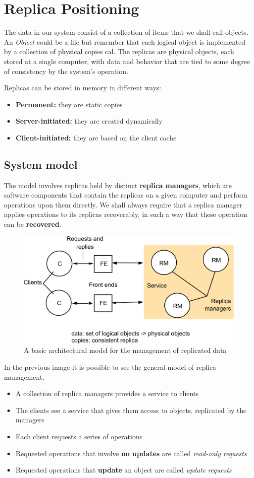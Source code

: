 \section{Replica Positioning}
The data in our system consist of a collection of items that we shall call objects. An \textit{Object} could be a file but remember that each logical object is implemented by a collection of physical copies cal. The replicas are physical objects, each stored at a single computer, with data and behavior that are tied to some degree of consistency by the system’s operation.

Replicas can be stored in memory in different ways:
\begin{itemize}
    \item \textbf{Permanent:} they are static copies
    \item \textbf{Server-initiated:} they are created dynamically
    \item \textbf{Client-initiated:} they are based on the client cache
\end{itemize}

\subsection{System model}
The model involves replicas held by distinct \textbf{replica managers}, which are software components that contain the replicas on a given computer and perform operations upon them directly. We shall always require that a replica manager applies operations to its replicas recoverably, in such a way that these operation can be \textbf{recovered}.

\begin{figure}[!h]
    \centering
    \includegraphics[width=.70\linewidth]{images/Replication/ArchitecturalModelReplicatedData.png}
    \caption{A basic architectural model for the management of replicated data}
\end{figure}

In the previous image it is possible to see the general model of replica management.
\begin{itemize}
    \item A collection of replica managers provides a service to clients
    \item The clients see a service that gives them access to objects, replicated by the managers
    \item Each client requests a series of operations
    \item Requested operations that involve \textbf{no updates} are called \textit{read-only requests}
    \item Requested operations that \textbf{update} an object are called \textit{update requests}
\end{itemize}

